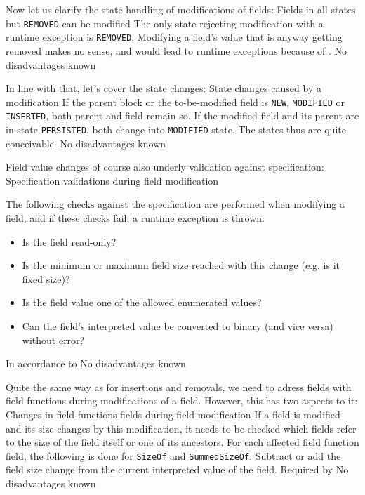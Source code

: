 Now let us clarify the state handling of modifications of fields:
{%
Fields in all states but \texttt{REMOVED} can be modified  
}
{%
The only state rejecting modification with a runtime exception is \texttt{REMOVED}.
}
{%
Modifying a field's value that is anyway getting removed makes no sense, and would lead to runtime exceptions because of .
}
{%
No disadvantages known
}

In line with that, let's cover the state changes:
{%
State changes caused by a modification
}
{%
If the parent block or the to-be-modified field is \texttt{NEW}, \texttt{MODIFIED} or \texttt{INSERTED}, both parent and field remain so. If the modified field and its parent are in state \texttt{PERSISTED}, both change into \texttt{MODIFIED} state.
}
{%
The states thus are quite conceivable.
}
{%
No disadvantages known
}

Field value changes of course also underly validation against specification:
{%
Specification validations during field modification
}
{%
The following checks against the specification are performed when modifying a field, and if these checks fail, a runtime exception is thrown:
\begin{itemize}
\item Is the field read-only?
\item Is the minimum or maximum field size reached with this change (e.g. is it fixed size)?
\item Is the field value one of the allowed enumerated values?
\item Can the field's interpreted value be converted to binary (and vice versa) without error?
\end{itemize}
}
{%
In accordance to 
}
{%
No disadvantages known
}

Quite the same way as for insertions and removals, we need to adress fields with field functions during modifications of a field. However, this has two aspects to it:
{%
Changes in field functions fields during field modification
}
{%
  If a field is modified and its size changes by this modification, it needs to be checked which fields refer to the size of the field itself or one of its ancestors. For each affected field function field, the following is done for \texttt{SizeOf} and \texttt{SummedSizeOf}: Subtract or add the field size change from the current interpreted value of the field.
}
{%
Required by 
}
{%
No disadvantages known
}

